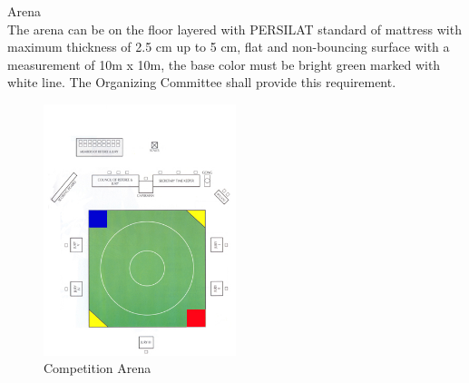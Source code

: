 \begin{legal}
\item Arena \\
The arena can be on the floor layered with PERSILAT standard of mattress with maximum thickness of 2.5 cm up to 5 cm, flat and non-bouncing surface with a measurement of 10m x 10m, the base color must be bright green marked with white line. The Organizing Committee shall provide this requirement.

 \begin{figure}[h]
    \centering
    \includegraphics[width=0.5\textwidth]{images/competition_arena}
    \caption{Competition Arena}
 \end{figure}




\end{legal}
